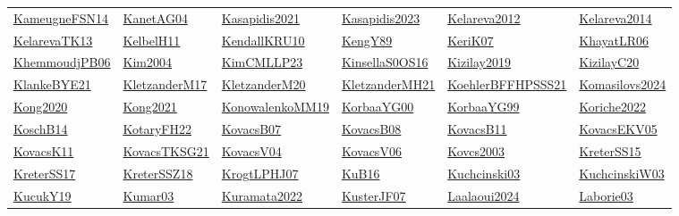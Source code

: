 \begin{longtable}{*{6}{l}}
\hyperref[detail:KameugneFSN14]{KameugneFSN14} & \hyperref[detail:KanetAG04]{KanetAG04} & \hyperref[detail:Kasapidis2021]{Kasapidis2021} & \hyperref[detail:Kasapidis2023]{Kasapidis2023} & \hyperref[detail:Kelareva2012]{Kelareva2012} & \hyperref[detail:Kelareva2014]{Kelareva2014}\\ 
\hyperref[detail:KelarevaTK13]{KelarevaTK13} & \hyperref[detail:KelbelH11]{KelbelH11} & \hyperref[detail:KendallKRU10]{KendallKRU10} & \hyperref[detail:KengY89]{KengY89} & \hyperref[detail:KeriK07]{KeriK07} & \hyperref[detail:KhayatLR06]{KhayatLR06}\\ 
\hyperref[detail:KhemmoudjPB06]{KhemmoudjPB06} & \hyperref[detail:Kim2004]{Kim2004} & \hyperref[detail:KimCMLLP23]{KimCMLLP23} & \hyperref[detail:KinsellaS0OS16]{KinsellaS0OS16} & \hyperref[detail:Kizilay2019]{Kizilay2019} & \hyperref[detail:KizilayC20]{KizilayC20}\\ 
\hyperref[detail:KlankeBYE21]{KlankeBYE21} & \hyperref[detail:KletzanderM17]{KletzanderM17} & \hyperref[detail:KletzanderM20]{KletzanderM20} & \hyperref[detail:KletzanderMH21]{KletzanderMH21} & \hyperref[detail:KoehlerBFFHPSSS21]{KoehlerBFFHPSSS21} & \hyperref[detail:Komasilovs2024]{Komasilovs2024}\\ 
\hyperref[detail:Kong2020]{Kong2020} & \hyperref[detail:Kong2021]{Kong2021} & \hyperref[detail:KonowalenkoMM19]{KonowalenkoMM19} & \hyperref[detail:KorbaaYG00]{KorbaaYG00} & \hyperref[detail:KorbaaYG99]{KorbaaYG99} & \hyperref[detail:Koriche2022]{Koriche2022}\\ 
\hyperref[detail:KoschB14]{KoschB14} & \hyperref[detail:KotaryFH22]{KotaryFH22} & \hyperref[detail:KovacsB07]{KovacsB07} & \hyperref[detail:KovacsB08]{KovacsB08} & \hyperref[detail:KovacsB11]{KovacsB11} & \hyperref[detail:KovacsEKV05]{KovacsEKV05}\\ 
\hyperref[detail:KovacsK11]{KovacsK11} & \hyperref[detail:KovacsTKSG21]{KovacsTKSG21} & \hyperref[detail:KovacsV04]{KovacsV04} & \hyperref[detail:KovacsV06]{KovacsV06} & \hyperref[detail:Kovcs2003]{Kovcs2003} & \hyperref[detail:KreterSS15]{KreterSS15}\\ 
\hyperref[detail:KreterSS17]{KreterSS17} & \hyperref[detail:KreterSSZ18]{KreterSSZ18} & \hyperref[detail:KrogtLPHJ07]{KrogtLPHJ07} & \hyperref[detail:KuB16]{KuB16} & \hyperref[detail:Kuchcinski03]{Kuchcinski03} & \hyperref[detail:KuchcinskiW03]{KuchcinskiW03}\\ 
\hyperref[detail:KucukY19]{KucukY19} & \hyperref[detail:Kumar03]{Kumar03} & \hyperref[detail:Kuramata2022]{Kuramata2022} & \hyperref[detail:KusterJF07]{KusterJF07} & \hyperref[detail:Laalaoui2024]{Laalaoui2024} & \hyperref[detail:Laborie03]{Laborie03}\\ 

\end{longtable}
